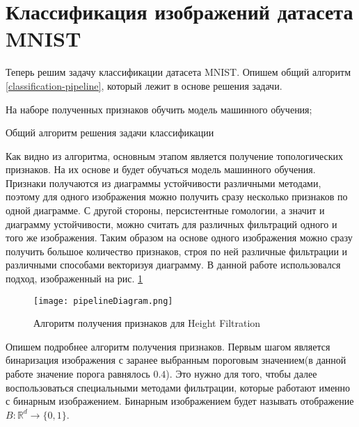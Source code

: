 \section{Классификация изображений датасета MNIST}

Теперь решим задачу классификации датасета MNIST. Опишем общий алгоритм \ref{classification-pipeline}, который лежит в основе решения задачи.

\medskip
\begin{algorithm}[H]
	\small
	\SetAlgoLined
	
	На наборе полученных признаков обучить модель машинного обучения;
	\caption{Общий алгоритм решения задачи классификации}
	\label{classification-pipeline}
\end{algorithm}
\medskip

Как видно из алгоритма, основным этапом является получение топологических признаков. На их основе и будет обучаться модель машинного обучения. Признаки получаются из диаграммы устойчивости различными методами, поэтому для одного изображения можно получить сразу несколько признаков по одной диаграмме. С другой стороны, персистентные гомологии, а значит и диаграмму устойчивости, можно считать для различных фильтраций одного и того же изображения. Таким образом на основе одного изображения можно сразу получить большое количество признаков, строя по ней различные фильтрации и различными способами векторизуя диаграмму. В данной работе использовался подход, изображенный на рис. \ref{pipeline}

\begin{figure}[!htbp]
	\begin{center}
		\texttt{[image: pipelineDiagram.png]}\\
		\caption{Алгоритм получения признаков для Height Filtration}
		\label{pipeline}
	\end{center}
\end{figure}

Опишем подробнее алгоритм получения признаков. Первым шагом является бинаризация изображения с заранее выбранным пороговым значением(в данной работе значение порога равнялось $0.4$). Это нужно для того, чтобы далее воспользоваться специальными методами фильтрации, которые работают именно с бинарным изображением. Бинарным изображением будет называть отображение $B: \mathbb{R}^d \to \{0, 1\}$.

